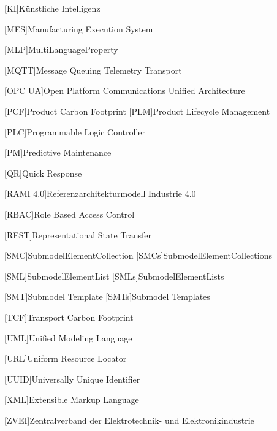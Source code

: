 {\begin{acronym}[RAMI 4.0]
[KI]{Künstliche Intelligenz}

[MES]{Manufacturing Execution System}

[MLP]{MultiLanguageProperty}

[MQTT]{Message Queuing Telemetry Transport}

[OPC UA]{Open Platform Communications Unified Architecture}

[PCF]{Product Carbon Footprint}
[PLM]{Product Lifecycle Management}

[PLC]{Programmable Logic Controller}

[PM]{Predictive Maintenance}

[QR]{Quick Response}

[RAMI 4.0]{Referenzarchitekturmodell Industrie 4.0}

[RBAC]{Role Based Access Control}

[REST]{Representational State Transfer}

[SMC]{SubmodelElementCollection}
[SMCs]{SubmodelElementCollections}

[SML]{SubmodelElementList}
[SMLs]{SubmodelElementLists}

[SMT]{Submodel Template}
[SMTs]{Submodel Templates}

[TCF]{Transport Carbon Footprint}

[UML]{Unified Modeling Language}

[URL]{Uniform Resource Locator}

[UUID]{Universally Unique Identifier}

[XML]{Extensible Markup Language}

[ZVEI]{Zentralverband der Elektrotechnik- und Elektronikindustrie}
\end{acronym}
}

\newpage